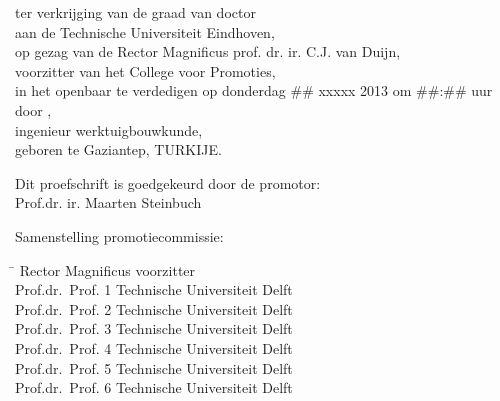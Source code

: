 \smallskip{}


\begin{center}
ter verkrijging van de graad van doctor\\
aan de Technische Universiteit Eindhoven,\\
op gezag van de Rector Magnificus prof. dr. ir. C.J. van Duijn,\\
voorzitter van het College voor Promoties,\\
in het openbaar te verdedigen op donderdag \#\# xxxxx 2013 om \#\#:\#\# uur\\
door \theauthor,\\
ingenieur werktuigbouwkunde,\\
geboren te Gaziantep, TURKIJE.
\end{center}

\newpage %
\thispagestyle{empty}

\noindent Dit proefschrift is goedgekeurd door de promotor:\\
Prof.dr. ir. Maarten Steinbuch\\
\bigskip{}

\noindent Samenstelling promotiecommissie:
\smallskip{}
\noindent
\begin{flushleft}\begin{tabbing}
\hspace*{50mm}\=\kill
Rector Magnificus \> voorzitter\\
Prof.dr.\ Prof. 1 \> Technische Universiteit Delft\\
Prof.dr.\ Prof. 2 \> Technische Universiteit Delft\\
Prof.dr.\ Prof. 3 \> Technische Universiteit Delft\\
Prof.dr.\ Prof. 4 \> Technische Universiteit Delft\\
Prof.dr.\ Prof. 5 \> Technische Universiteit Delft\\
Prof.dr.\ Prof. 6 \> Technische Universiteit Delft\\
\end{tabbing}\end{flushleft}
\smallskip

